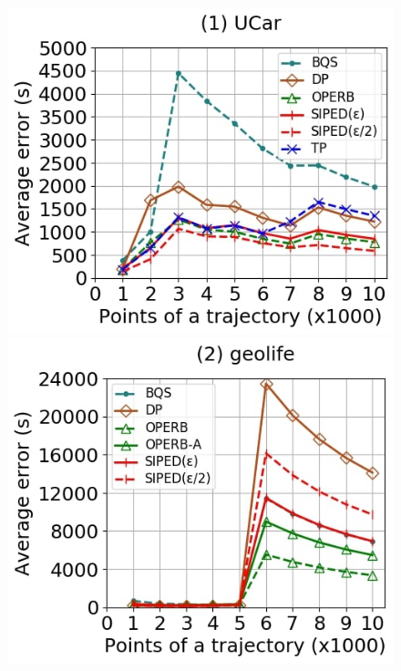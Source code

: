 {\begin{figure}[tb!]
	\centering
	\includegraphics[scale=0.250]{Figures/Exp-when-PED-error-size-service.jpg} 	\hspace{0.5ex}
	\includegraphics[scale=0.250]{Figures/Exp-when-PED-error-size-geolife.jpg}	\hspace{0.5ex}

\end{figure}}
